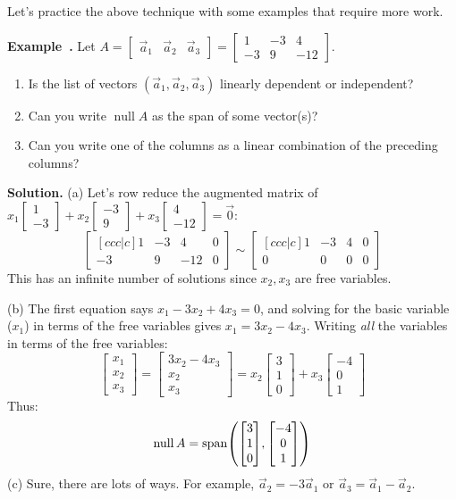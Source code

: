 \documentclass[11pt, letterpaper]{report}
\newenvironment{notes}{}{}
\newenvironment{book}{}{}
\let\originalleft\left
\let\originalright\right
\renewcommand{\left}{\mathopen{}\mathclose\bgroup\originalleft}
\renewcommand{\right}{\aftergroup\egroup\originalright}
\newcounter{example}[section]
\newcommand{\example}{\refstepcounter{example}%
\par\noindent\textbf{Example~\theexample.} }
\DeclareMathOperator{\nul}{null}
\DeclareMathOperator{\spn}{span}
\newcommand{\bbvec}[2]{
  \begin{bmatrix} #1 \\ #2 \end{bmatrix}
}
\newcommand{\bbbvec}[3]{
  \begin{bmatrix} #1 \\ #2 \\ #3 \end{bmatrix}
}
\begin{document}
\begin{notes}
\newpage
\end{notes}

Let's practice the above technique with some examples that require more work.

\example {}  Let $A = \begin{bmatrix}
\vec{a}_1 & \vec{a}_2 & \vec{a}_3
\end{bmatrix} = \begin{bmatrix}
1 & -3 & 4 \\
-3 & 9 & -12
\end{bmatrix}$.
\begin{enumerate}[label=(\alph*)]
\item Is the list of vectors $( \vec{a}_1, \vec{a}_2, \vec{a}_3 )$ linearly dependent or independent?
\item Can you write $\nul A$ as the span of some vector(s)?
\item Can you write one of the columns as a linear combination of the preceding columns?
\end{enumerate}

\begin{notes}
\vfill
\end{notes}

\begin{book}
\textbf{Solution.} (a) Let's row reduce the augmented matrix of $x_1 \bbvec{1}{-3} + x_2 \bbvec{-3}{9} + x_3 \bbvec{4}{-12} = \vec{0}$:
\[
\begin{bmatrix}[ccc|c]
1 & -3 & 4 & 0 \\
-3 & 9 & -12 & 0
\end{bmatrix} \sim 
\begin{bmatrix}[ccc|c]
1 & -3 & 4 & 0 \\
0 & 0 & 0 & 0
\end{bmatrix}
\]
This has an infinite number of solutions since $x_2, x_3$ are free variables.

(b) The first equation says $x_1-3x_2+4x_3=0$, and solving for the basic variable ($x_1$) in terms of the free variables gives $x_1=3x_2-4x_3$. Writing \emph{all} the variables in terms of the free variables:
\[
\bbbvec{x_1}{x_2}{x_3} = \bbbvec{3x_2-4x_3}{x_2}{x_3} = x_2 \bbbvec{3}{1}{0} + x_3 \bbbvec{-4}{0}{1}
\]
Thus: 
\[\nul A = \spn \left( \bbbvec{3}{1}{0}, \bbbvec{-4}{0}{1} \right)\]
(c) Sure, there are lots of ways. For example, $\vec{a}_2=-3\vec{a}_1$ or $\vec{a}_3=\vec{a}_1-\vec{a}_2$. \blacksquare
\end{book}
\end{document}
